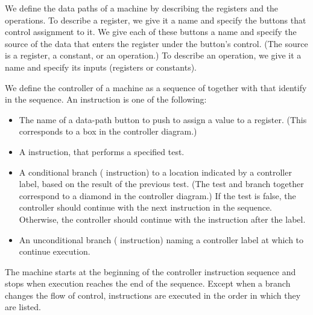 We define the data paths of a machine by describing the registers and the
operations.  To describe a register, we give it a name and specify the buttons
that control assignment to it.  We give each of these buttons a name and
specify the source of the data that enters the register under the button's
control.  (The source is a register, a constant, or an operation.)  To describe
an operation, we give it a name and specify its inputs (registers or
constants).

We define the controller of a machine as a sequence of 
together with  that identify  in the
sequence. An instruction is one of the following:

\begin{itemize}

\item
The name of a data-path button to push to assign a value to a register.  (This
corresponds to a box in the controller diagram.)

\item
A  instruction, that performs a specified test.

\item
A conditional branch ( instruction) to a location indicated by a
controller label, based on the result of the previous test.  (The test and
branch together correspond to a diamond in the controller diagram.)  If the
test is false, the controller should continue with the next instruction in the
sequence.  Otherwise, the controller should continue with the instruction after
the label.

\item
An unconditional branch ( instruction) naming a controller label at
which to continue execution.

\end{itemize}

\noindent
The machine starts at the beginning of the controller instruction sequence and
stops when execution reaches the end of the sequence.  Except when a branch
changes the flow of control, instructions are executed in the order in which
they are listed.


